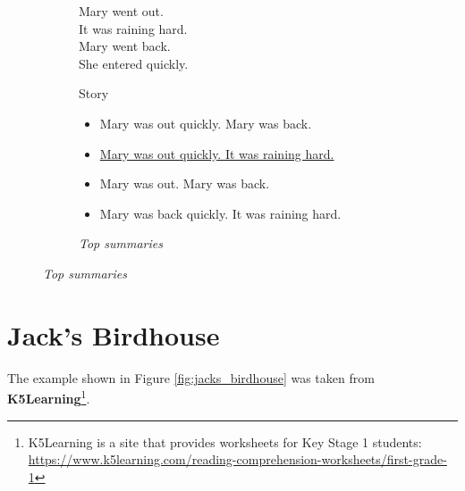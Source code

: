 \begin{figure}[H]
\begin{subfigure}{0.4\textwidth}
\begin{displayquote}
Mary went out.\\
It was raining hard.\\
Mary went back.\\
She entered quickly.
\end{displayquote}
\caption{Story}
\end{subfigure}
\begin{subfigure}{0.6\textwidth}
\begin{itemize}[nolistsep]
\item Mary was out quickly. Mary was back.
\item \ul{Mary was out quickly. It was raining hard.}
\item Mary was out. Mary was back.
\item Mary was back quickly. It was raining hard.
\end{itemize}
\vspace{\topsep}
\caption{\textit{Top summaries}}
\end{subfigure}
\end{figure}

\section{Jack's Birdhouse}

The example shown in Figure \ref{fig:jacks_birdhouse} was taken from \textbf{K5Learning}\footnote{K5Learning is a site that provides worksheets for Key Stage 1 students: \url{https://www.k5learning.com/reading-comprehension-worksheets/first-grade-1}}.

